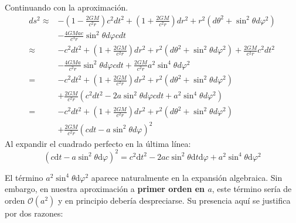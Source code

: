 Continuando con la aproximación.
\begin{equation}
    \begin{aligned}
        d s^2 \approx & -\left(1-\frac{2 G M}{c^2 r}\right) c^2 d t^2+\left(1+\frac{2 G M}{c^2 r}\right) d r^2+r^2\left(d \theta^2+\sin ^2 \theta d \varphi^2\right) \\
                      & -\frac{4 G M a c}{c^3 r} \sin ^2 \theta d \varphi c d t                                                                                      \\
        \approx       & -c^2 d t^2+\left(1+\frac{2 G M}{c^2 r}\right) d r^2+r^2\left(d \theta^2+\sin ^2 \theta d \varphi^2\right)+\frac{2 G M}{c^2 r} c^2 d t^2      \\
                      & -\frac{4 G M a}{c^2 r} \sin ^2 \theta d \varphi c d t+\frac{2 G M}{c^2 r} a^2 \sin ^4 \theta d \varphi^2                                     \\
        =             & -c^2 d t^2+\left(1+\frac{2 G M}{c^2 r}\right) d r^2+r^2\left(d \theta^2+\sin ^2 \theta d \varphi^2\right)                                    \\
                      & +\frac{2 G M}{c^2 r}\left(c^2 d t^2-2 a \sin ^2 \theta d \varphi c d t+a^2 \sin ^4 \theta d \varphi^2\right)                                 \\
        =             & -c^2 d t^2+\left(1+\frac{2 G M}{c^2 r}\right) d r^2+r^2\left(d \theta^2+\sin ^2 \theta d \varphi^2\right)                                    \\
                      & +\frac{2 G M}{c^2 r}\left(c d t-a \sin ^2 \theta d \varphi\right)^2
    \end{aligned}
\end{equation}
Al expandir el cuadrado perfecto en la última línea:
\begin{equation}
    \left(c\mathrm{d}t - a\sin^2\theta\mathrm{d}\varphi\right)^2 = c^2\mathrm{d}t^2 - 2ac\sin^2\theta\mathrm{d}t\mathrm{d}\varphi + a^2\sin^4\theta\mathrm{d}\varphi^2
\end{equation}

El término $a^2\sin^4\theta\mathrm{d}\varphi^2$ aparece naturalmente en la expansión algebraica. Sin embargo, en nuestra aproximación a \textbf{primer orden en $a$}, este término sería de orden $\mathcal{O}(a^2)$ y en principio debería despreciarse. Su presencia aquí se justifica por dos razones:

